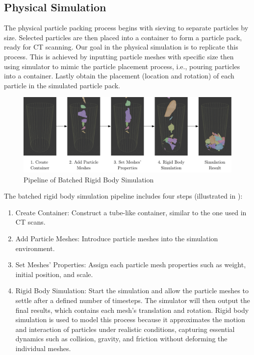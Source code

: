 \documentclass[preprint,12pt]{elsarticle}
\begin{document}
\subsection{Physical Simulation}
The physical particle packing process begins with sieving to separate particles by size. 
Selected particles are then placed into a container to form a particle pack, ready for CT scanning.
Our goal in the physical simulation is to replicate this process.
This is achieved by inputting particle meshes with specific size then using simulator to mimic the particle placement process, i.e., pouring particles into a container. 
Lastly obtain the placement (location and rotation) of each particle in the simulated particle pack.
\begin{figure}[H]
    \includegraphics[width=\textwidth]{figures/pdf/simulation-pipeline.pdf}
    \caption{Pipeline of Batched Rigid Body Simulation}
    \label{fig:batched_rigid_body_simulation_pipeline}
\end{figure}
\par
The batched rigid body simulation pipeline includes four steps (illustrated in ): 
\begin{enumerate}
    \item Create Container: Construct a tube-like container, similar to the one used in CT scans.
    \item Add Particle Meshes: Introduce particle meshes into the simulation environment.
    \item Set Meshes' Properties: Assign each particle mesh properties such as weight, initial position, and scale.
    \item Rigid Body Simulation: Start the simulation and allow the particle meshes to settle after a defined number of timesteps. The simulator will then output the final results, which contains each mesh's translation and rotation.
    Rigid body simulation is used to model this process because it approximates the motion and interaction of particles under realistic conditions, capturing essential dynamics such as collision, gravity, and friction without deforming the individual meshes.
\end{enumerate}
\end{document}
